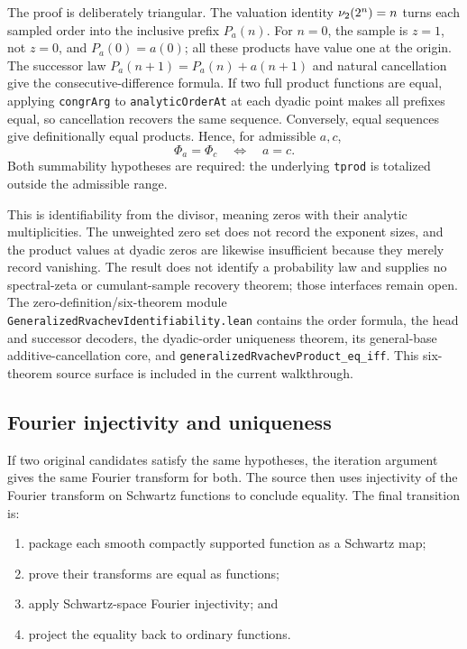\documentclass[11pt,oneside]{article}
\theoremstyle{definition}
\theoremstyle{remark}
\begin{document}
The proof is deliberately triangular.  The valuation identity
\(\nu_{2}(2^n)=n\) turns each sampled order into the inclusive prefix
\(P_a(n)\).  For \(n=0\), the sample is \(z=1\), not \(z=0\), and
\(P_a(0)=a(0)\); all these products have value one at the origin.  The
successor law \(P_a(n+1)=P_a(n)+a(n+1)\) and natural cancellation give the
consecutive-difference formula.  If two full product functions are equal,
applying \nolinkurl{congrArg} to \nolinkurl{analyticOrderAt} at each dyadic
point makes all prefixes equal, so cancellation recovers the same sequence.
Conversely, equal sequences give definitionally equal products.  Hence, for
admissible \(a,c\),
\[
 \Phi_a=\Phi_c\quad\Longleftrightarrow\quad a=c.
\]
Both summability hypotheses are required: the underlying \nolinkurl{tprod}
is totalized outside the admissible range.

This is identifiability from the divisor, meaning zeros with their analytic
multiplicities.  The unweighted zero set does not record the exponent sizes,
and the product values at dyadic zeros are likewise insufficient because
they merely record vanishing.  The result does not identify a probability
law and supplies no spectral-zeta or cumulant-sample recovery theorem; those
  interfaces remain open.  The zero-definition/six-theorem module
  \nolinkurl{GeneralizedRvachevIdentifiability.lean} contains the order formula,
  the head and successor decoders, the dyadic-order uniqueness theorem, its
  general-base additive-cancellation core, and
  \nolinkurl{generalizedRvachevProduct_eq_iff}.  This six-theorem source surface
  is included in the current walkthrough.

\subsection{Fourier injectivity and uniqueness}
If two original candidates satisfy the same hypotheses, the iteration argument gives the same Fourier transform for both.  The source then uses injectivity of the Fourier transform on Schwartz functions to conclude equality.  The final transition is:
\begin{enumerate}
  \item package each smooth compactly supported function as a Schwartz map;
  \item prove their transforms are equal as functions;
  \item apply Schwartz-space Fourier injectivity; and
  \item project the equality back to ordinary functions.
\end{enumerate}
\end{document}
